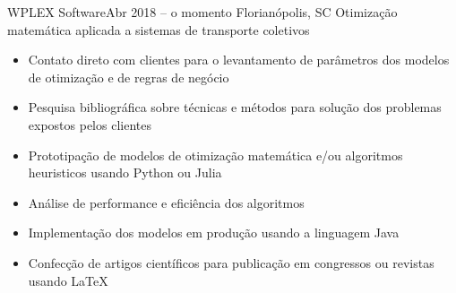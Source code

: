 \documentclass[10pt,a4paper]{altacv}
\begin{document}

\begin{fullwidth}
\makecvheader
\end{fullwidth}




        {WPLEX Software}{Abr 2018 -- o momento}
        {Florianópolis, SC}
Otimização matemática aplicada a sistemas de transporte coletivos
\vspace{0.2cm}
\begin{itemize}
\item Contato direto com clientes para o levantamento de parâmetros dos
    modelos de otimização e de regras de negócio
\item Pesquisa bibliográfica sobre técnicas e métodos para solução dos 
    problemas expostos pelos clientes
\item Prototipação de modelos de otimização matemática e/ou algoritmos
    heuristicos usando Python ou Julia
\item Análise de performance e eficiência dos algoritmos
\item Implementação dos modelos em produção usando a linguagem Java
\item Confecção de artigos científicos para publicação em congressos ou 
    revistas usando \LaTeX
\end{itemize}
\end{document}
